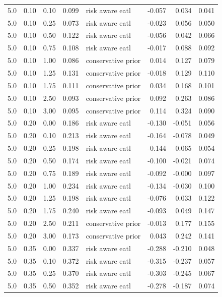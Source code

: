 \begin{longtable}{rrrrlrrr}
5.0 & 0.10 & 0.10 & 0.099 & risk aware eatl & -0.057 & 0.034 & 0.041 \\
5.0 & 0.10 & 0.25 & 0.073 & risk aware eatl & -0.023 & 0.056 & 0.050 \\
5.0 & 0.10 & 0.50 & 0.122 & risk aware eatl & -0.056 & 0.042 & 0.066 \\
5.0 & 0.10 & 0.75 & 0.108 & risk aware eatl & -0.017 & 0.088 & 0.092 \\
5.0 & 0.10 & 1.00 & 0.086 & conservative prior & 0.014 & 0.127 & 0.079 \\
5.0 & 0.10 & 1.25 & 0.131 & conservative prior & -0.018 & 0.129 & 0.110 \\
5.0 & 0.10 & 1.75 & 0.111 & conservative prior & 0.034 & 0.168 & 0.101 \\
5.0 & 0.10 & 2.50 & 0.093 & conservative prior & 0.092 & 0.263 & 0.086 \\
5.0 & 0.10 & 3.00 & 0.095 & conservative prior & 0.114 & 0.324 & 0.090 \\
5.0 & 0.20 & 0.00 & 0.186 & risk aware eatl & -0.130 & -0.051 & 0.056 \\
5.0 & 0.20 & 0.10 & 0.213 & risk aware eatl & -0.164 & -0.078 & 0.049 \\
5.0 & 0.20 & 0.25 & 0.198 & risk aware eatl & -0.144 & -0.065 & 0.054 \\
5.0 & 0.20 & 0.50 & 0.174 & risk aware eatl & -0.100 & -0.021 & 0.074 \\
5.0 & 0.20 & 0.75 & 0.189 & risk aware eatl & -0.092 & -0.000 & 0.097 \\
5.0 & 0.20 & 1.00 & 0.234 & risk aware eatl & -0.134 & -0.030 & 0.100 \\
5.0 & 0.20 & 1.25 & 0.198 & risk aware eatl & -0.076 & 0.033 & 0.122 \\
5.0 & 0.20 & 1.75 & 0.240 & risk aware eatl & -0.093 & 0.049 & 0.147 \\
5.0 & 0.20 & 2.50 & 0.211 & conservative prior & -0.013 & 0.177 & 0.155 \\
5.0 & 0.20 & 3.00 & 0.173 & conservative prior & 0.043 & 0.242 & 0.141 \\
5.0 & 0.35 & 0.00 & 0.337 & risk aware eatl & -0.288 & -0.210 & 0.048 \\
5.0 & 0.35 & 0.10 & 0.372 & risk aware eatl & -0.315 & -0.237 & 0.057 \\
5.0 & 0.35 & 0.25 & 0.370 & risk aware eatl & -0.303 & -0.245 & 0.067 \\
5.0 & 0.35 & 0.50 & 0.352 & risk aware eatl & -0.278 & -0.187 & 0.074 \\

\end{longtable}
